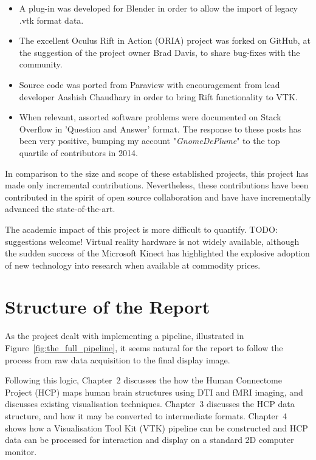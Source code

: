 \documentclass[MSc,paper=a4,pagesize=auto]{icldt}
\begin{document}
\begin{itemize}
  \item A plug-in was developed for Blender in order to allow the import of legacy .vtk format data.
  \item The excellent Oculus Rift in Action (ORIA) project was forked on GitHub, at the suggestion of the project owner Brad Davis, to share bug-fixes with the community.
  \item Source code was ported from Paraview with encouragement from lead developer Aashish Chaudhary in order to bring Rift functionality to VTK.
  \item When relevant, assorted software problems were documented on Stack Overflow in 'Question and Answer' format. The response to these posts has been very positive, bumping my account "\textit{GnomeDePlume}" to the top quartile of contributors in 2014.  
\end{itemize}

In comparison to the size and scope of these established projects, this project has made only incremental contributions. Nevertheless, these contributions have been contributed in the spirit of open source collaboration and have have incrementally advanced the state-of-the-art.

The academic impact of this project is more difficult to quantify. TODO: suggestions welcome! Virtual reality hardware is not widely available, although the sudden success of the Microsoft Kinect has highlighted the explosive adoption of new technology into research when available at commodity prices.

\newpage
\section{Structure of the Report}
As the project dealt with implementing a pipeline, illustrated in Figure~\ref{fig:the_full_pipeline}, it seems natural for the report to follow the process from raw data acquisition to the final display image. 

Following this logic, Chapter~2 discusses the how the Human Connectome Project (HCP) maps human brain structures using DTI and fMRI imaging, and discusses existing visualisation techniques. Chapter~3 discusses the HCP data structure, and how it may be converted to intermediate formats. Chapter~4 shows how a Visualisation Tool Kit (VTK) pipeline can be constructed and HCP data can be processed for interaction and display on a standard 2D computer monitor. 
\end{document}
